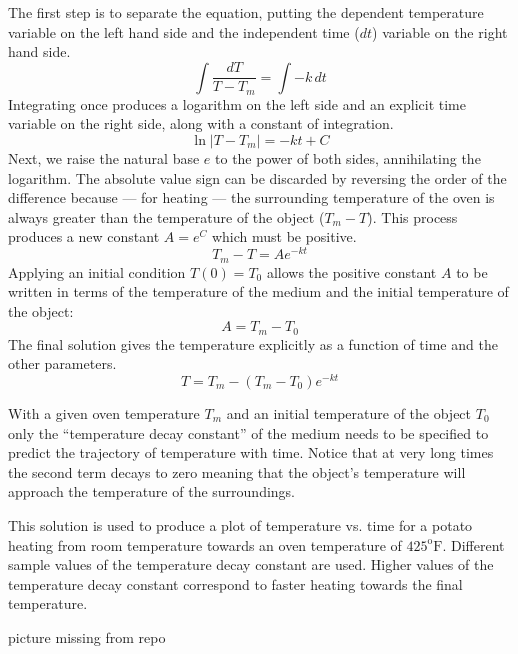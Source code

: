 \documentclass{ximera}
\begin{document}
The first step is to separate the equation, putting the dependent temperature variable on the left hand side and the independent time ($dt$)  variable on the right hand side.
\[
\int\frac{dT}{T-T_m}=\int -k\,dt
\]
Integrating once produces a logarithm on the left side and an explicit time variable on the right side, along with a constant of integration.
\[
\ln|T-T_m|=-kt+C
\]
Next, we raise the natural base $e$ to the power of both sides, annihilating the logarithm.  The absolute value sign can be discarded by reversing the order of the difference because --- for heating --- the surrounding temperature of the oven is always greater than the temperature of the object ($T_m-T$). This process produces a new constant $A=e^C$ which must be positive.
\[
T_m-T=Ae^{-kt}
\]
Applying an initial condition $T(0)=T_0$ allows the positive constant $A$ to be written in terms of the temperature of the medium and the initial temperature of the object:
\[
A=T_m-T_0
\]
The final solution gives the temperature explicitly as a function of time and the other parameters.
\[
T=T_m-(T_m-T_0)e^{-kt}
\]
 
With a given oven temperature $T_m$ and an initial temperature of the object $T_0$ only the ``temperature decay constant'' of the medium  needs to be specified to predict the trajectory of temperature with time.  Notice that at very long times the second term decays to zero meaning that the object's temperature will approach the temperature of the surroundings.
 
This solution is used to produce a plot of temperature vs. time for a potato heating from room temperature towards an oven temperature of $425^{\text{o}}\text{F}$.  Different sample values of the temperature decay constant  are used.  Higher values of the temperature decay constant correspond to faster heating towards the final temperature.
 
\begin{image}
picture missing from repo
\end{image}
 
\end{document}

